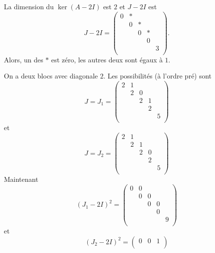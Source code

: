 \begin{example} 
\label{exe:54}
  La dimension du $\ker(A - 2 I)$ est $2$ et $J - 2I$ est
  \begin{displaymath}
     J  - 2I =
  \begin{pmatrix}
    0 & *  \\
    & 0 & * \\
    & & 0 & * \\
    & & & 0   \\
    & & & & 3 \\
  \end{pmatrix}. 
\end{displaymath}
Alors, un des $*$ est zéro, les autres deux sont égaux à $1$.

On a deux blocs avec diagonale $2$. Les possibilités (à l'ordre pré) sont
\begin{displaymath}
J =   J_1 =  \begin{pmatrix}
    2 & 1  \\
    & 2 & 0 \\
    & & 2 & 1 \\
    & & & 2   \\
    & & & & 5 \\
  \end{pmatrix}
\end{displaymath}
et
\begin{displaymath}
J =   J_2 =  \begin{pmatrix}
    2 & 1  \\
    & 2 & 1 \\
    & & 2 & 0 \\
    & & & 2   \\
    & & & & 5 \\
  \end{pmatrix}
\end{displaymath}
Maintenant
\begin{displaymath}
  (J_1 - 2I)^2 =
  \begin{pmatrix}
     0 &0  \\
    & 0 & 0 \\
    & & 0 & 0 \\
    & & & 0   \\
    & & & & 9 \\
  \end{pmatrix}
\end{displaymath}
et
\begin{displaymath}
  (J_2 - 2I)^2 =
  \begin{pmatrix}
     0 &0 &1   \\

\end{pmatrix}
\end{displaymath}
\end{example}
